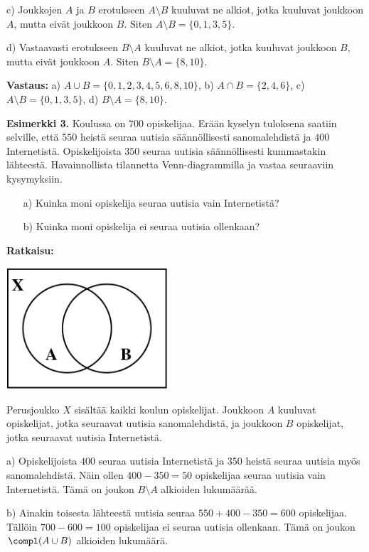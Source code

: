 c) Joukkojen $A$ ja $B$ erotukseen $A \setminus B$ kuuluvat ne alkiot, jotka kuuluvat joukkoon $A$, mutta eivät joukkoon $B$. Siten $A \setminus B = \{0, 1, 3, 5\}$.

d) Vastaavasti erotukseen $B \setminus A$ kuuluvat ne alkiot, jotka kuuluvat joukkoon $B$, mutta eivät joukkoon $A$. Siten $B \setminus A = \{8, 10\}$.

{\bf Vastaus:} a) $A \cup B = \{0, 1, 2, 3, 4, 5, 6, 8, 10\}$,  b) $A \cap B = \{2, 4, 6\}$,  c) $A \setminus B = \{0, 1, 3,5\}$,  d) $B \setminus A = \{8, 10\}$.



{\bf Esimerkki 3.}
Koulussa on $700$ opiskelijaa. Erään kyselyn tuloksena saatiin selville, että $550$ heistä 
seuraa uutisia säännöllisesti sanomalehdistä ja $400$ Internetistä. Opiskelijoista $350$  
seuraa uutisia säännöllisesti kummastakin lähteestä. Havainnollista tilannetta Venn-diagrammilla ja vastaa seuraaviin kysymyksiin.
\begin{itemize}
\item[a)] Kuinka moni opiskelija seuraa uutisia vain Internetistä?
\item[b)] Kuinka moni opiskelija ei seuraa uutisia ollenkaan?
\end{itemize}

{\bf Ratkaisu:}

\begin{center}
\includegraphics[width=6cm]{kuvat/venn2}
\end{center}

Perusjoukko $X$ sisältää kaikki koulun opiskelijat. Joukkoon $A$ kuuluvat opiskelijat, jotka seuraavat uutisia sanomalehdistä, ja joukkoon $B$ opiskelijat, jotka seuraavat uutisia Internetistä.

a) Opiskelijoista $400$ seuraa uutisia Internetistä ja $350$ heistä seuraa uutisia myös sanomalehdistä. Näin ollen $400 - 350 = 50$ opiskelijaa seuraa uutisia vain Internetistä. Tämä on joukon $B \setminus A$ alkioiden lukumäärää. 

b) Ainakin toisesta lähteestä uutisia seuraa $550 + 400 - 350 = 600$ opiskelijaa. Tällöin $700 - 600 = 100$ opiskelijaa ei seuraa uutisia ollenkaan. Tämä on joukon $\compl(A\cup B)$ alkioiden lukumäärä.

